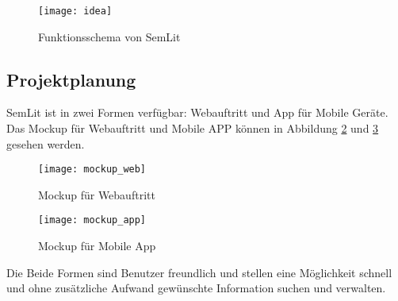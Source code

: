 \begin{figure}[h!]
\centering
\texttt{[image: idea]}
\caption{Funktionsschema von SemLit}
\label{fig:idea}
\end{figure}



\subsection{Projektplanung}

SemLit ist in zwei Formen verfügbar: Webauftritt und App für Mobile Geräte. Das Mockup für Webauftritt und Mobile APP können in Abbildung \ref{fig:web} und \ref{fig:app} gesehen werden.

\begin{figure}[h!]
\centering
\texttt{[image: mockup\_web]}
\caption{Mockup für Webauftritt}
\label{fig:web}
\end{figure}

\begin{figure}[h!]
\centering
\texttt{[image: mockup\_app]}
\caption{Mockup für Mobile App}
\label{fig:app}
\end{figure}

Die Beide Formen sind Benutzer freundlich und stellen eine Möglichkeit schnell und ohne zusätzliche Aufwand gewünschte Information suchen und verwalten.\\


